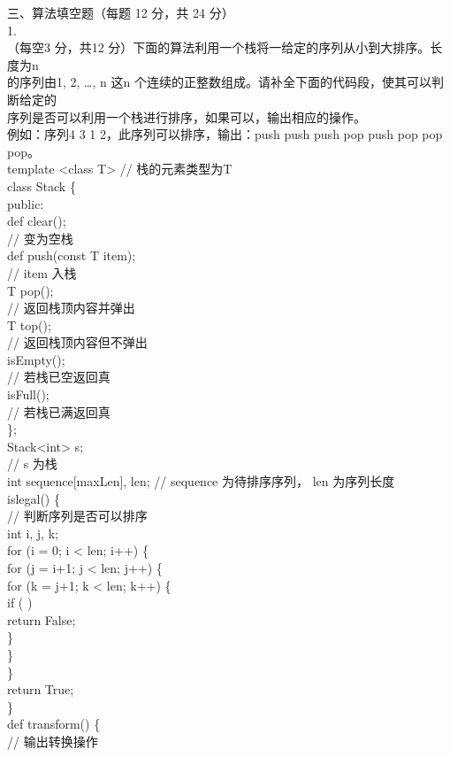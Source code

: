 \begin{question}
三、算法填空题（每题 12 分，共 24 分）\\
1.\\
（每空3 分，共12 分）下面的算法利用一个栈将一给定的序列从小到大排序。长度为n\\
的序列由1, 2, …, n 这n 个连续的正整数组成。请补全下面的代码段，使其可以判断给定的\\
序列是否可以利用一个栈进行排序，如果可以，输出相应的操作。\\
例如：序列4 3 1 2，此序列可以排序，输出：push push push pop push pop pop pop。\\
template <class T>                            // 栈的元素类型为T\\
class Stack \{\\
public:\\
def clear();\\
// 变为空栈\\
def push(const T item);\\
//  item 入栈\\
T pop();\\
// 返回栈顶内容并弹出\\
T top();\\
// 返回栈顶内容但不弹出\\
isEmpty();\\
// 若栈已空返回真\\
isFull();\\
// 若栈已满返回真\\
\};\\
Stack<int> s;\\
//  s 为栈\\
int sequence[maxLen],  len;                 // sequence 为待排序序列， len 为序列长度\\
islegal()  \{\\
// 判断序列是否可以排序\\
int i, j, k;\\
for (i = 0; i < len; i++) \{\\
for (j = i+1; j < len; j++) \{\\
for (k = j+1; k < len; k++) \{\\
if (            )\\
return False;\\
\}\\
\}\\
\}\\
return True;\\
\}\\
def transform()  \{\\
// 输出转换操作\\

\end{question}
